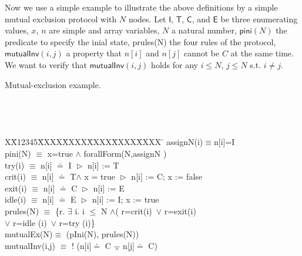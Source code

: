 \documentclass[final]{IEEEtran}
\newlength{\fminilength}
\newenvironment{fmini}[1][\linewidth]
  {\setlength{\fminilength}{#1\fboxsep-2\fboxrule}%
   \vspace{2ex}\noindent\begin{lrbox}{\fminibox}\begin{minipage}{\fminilength}%
   \mbox{ }\hfill\vspace{-2.5ex}}%
  {\end{minipage}\end{lrbox}\vspace{1ex}\hspace{0ex}%
   \framebox{\usebox{\fminibox}}}
\newenvironment{specification}
{\noindent\scriptsize
\tt\begin{fmini}\begin{tabbing}X\=X12345\=XXXX\=XXXX\=XXXX\=XXXX\=XXXX
\=\+\kill} {\end{tabbing}\normalfont\end{fmini}}
\def \eqc {\doteq }
\def \andc {\barwedge }
\def \negc {!}
\begin{document}
Now we use a simple example to illustrate the above definitions by a simple mutual exclusion protocol with $N$ nodes. Let $\mathsf{I}$, $\mathsf{T}$,
 $\mathsf{C}$, and  $\mathsf{E}$  be three enumerating values, $x$,    $n$ are  simple and array variables, $N$ a natural number,  $\mathsf{pini}(N)$   the predicate to specify the inial state, prules(N) the four rules of the protocol, $\mathsf{mutualInv}(i,j)$ a property that $n[i]$ and $ n[j]$ cannot be $C$ at the same time. We want to verify that $\mathsf{mutualInv}(i,j)$ holds for any $i\le N$, $j \le N$ s.t. $i \neq j$.
\vspace{-0.3cm}
\begin{example}\label{example1}Mutual-exclusion example.

\begin{specification}
assignN(i)$\equiv$n[i]=I\\
 pini(N) $\equiv$
   x=true $\wedge$  forallForm(N,assignN )\\

    try(i) $\equiv$ n[i] $\eqc$ I $\vartriangleright$ n[i] := T \\

    crit(i) $\equiv$ n[i] $\eqc$ T$\wedge$ x = true $\vartriangleright$  n[i] := C; x := false\\

%
   exit(i) $\equiv$ n[i] $\eqc$ C $\vartriangleright$ n[i] := E \\


   idle(i) $\equiv$  n[i] $\eqc$ E $\vartriangleright$ n[i] := I;  x := true
  \\%
   prules(N) $\equiv$ \{r. $\exists$ i. i $\le$ N $\wedge$( r=crit(i)~$\vee$ r=exit(i) \\
    $\vee$ r=idle (i)~$\vee$ r=try (i)\}\\

mutualEx(N)$\equiv$ (pIni(N), prules(N))\\

mutualInv(i,j) $\equiv$
  $\negc$ (n[i]$\eqc$ C $\andc$ n[j]$\eqc$ C)\\



\end{specification}
\end{example}
\end{document}
